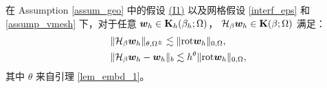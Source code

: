 \begin{lemma}
\label{lem_Hodge_est}
在 Assumption \ref{assum_geo} 中的假设 \hyperref[asp:I1]{(I1)} 以及网格假设 \ref{interf_eps} 和 \ref{assump_vmesh} 下，对于任意 $\boldsymbol{w}_h \in \mathbf{K}_h(\beta_h;\Omega)$，
$\mathcal{H}_{\beta}\boldsymbol{w}_h\in \mathbf{K}(\beta;\Omega)$ 满足：
\begin{subequations}
\label{lem_Hodge_est_eq0}
\begin{align}
& \|  \mathcal{H}_{\beta}\boldsymbol{w}_h  \|_{\theta,\Omega^{\pm}} \lesssim \| \mathrm{rot} \boldsymbol{w}_h \|_{0,\Omega}, \label{lem_Hodge_est_eq01}  \\
&  \| \mathcal{H}_{\beta}\boldsymbol{w}_h - \boldsymbol{w}_h \|_{b} \lesssim h^{\theta} \| \mathrm{rot} \boldsymbol{w}_h \|_{0,\Omega},  \label{lem_Hodge_est_eq02}
\end{align}
\end{subequations}
其中 $\theta$ 来自引理 \ref{lem_embd_1}。
\end{lemma}

